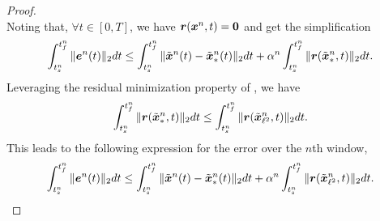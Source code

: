 \begin{proof}
\begin{equation*}
\end{equation*}
Noting that, $\forall t \in [0,T]$, we have $\boldsymbol r({\boldsymbol x}^{n},t) = \boldsymbol 0$ and get the simplification 
\begin{equation*}
\int_{t_s^{n}}^{t_f^{n}} \| \boldsymbol e^{n}(t) \|_2 dt \le \int_{t_s^{n}}^{t_f^{n}} \| \tilde{\boldsymbol x}^{n}(t) - \tilde{\boldsymbol x}_{*}^{n}(t) \|_2 dt + \alpha^{n} \int_{t_s^{n}}^{t_f^{n}} \|  \boldsymbol r(\tilde{\boldsymbol x}_{*}^{n},t)  \|_2 dt.
\end{equation*}
Leveraging the residual minimization property of \methodAcronym, we have 
$$ \int_{t_s^{n}}^{t_f^{n}} \| \boldsymbol r(\tilde{\boldsymbol x}_{*}^{n},t) \|_2dt \le \int_{t_s^{n}}^{t_f^{n}} \| \boldsymbol r(\tilde{\boldsymbol x}_{\ell^2}^{n},t) \|_2dt.$$
This leads to the following expression for the error over the $n$th window,
\begin{equation}\label{eq:boundtmp}
\int_{t_s^{n}}^{t_f^{n}} \| \boldsymbol e^{n}(t) \|_2 dt \le \int_{t_s^{n}}^{t_f^{n}} \| \tilde{\boldsymbol x}^{n}(t) - \tilde{\boldsymbol x}_{*}^{n}(t) \|_2 dt + \alpha^{n} \int_{t_s^{n}}^{t_f^{n}} \|  \boldsymbol r(\tilde{\boldsymbol x}_{\ell^2}^{n},t)  \|_2 dt.
\end{equation}
\begin{comment}
To obtain an expression for $\norm{\stateROMSolArg{n}{t} - \stateROMStarSolArgt{n}{t}}$ start by noting that
$\stateROMStarSolArg{n}$ and $\stateROMSolArg{n}$ are defined by the systems,
\begin{align*} 
&\frac{d}{dt} \genstateROMSolArg{n}   -
\basisspace^T  \velocity(\basisspace \genstateROMSolArg{n} + \stateIntercept,t) =  \adjointROMSolArg{n} , \\
 &\frac{d}{dt} \adjointROMSolArg{n} + \basisspace^T \bigg[\frac{\partial
\velocity}{\partial \stateyDiscrete}(\basisspace \genstateROMSolArg{n} +
\stateIntercept,t)\bigg]^T \basisspace \adjointROMSolArg{n} = \basisspace^T \bigg[
\frac{\partial \velocity}{\partial \stateyDiscrete} (\basisspace \genstateROMSolArg{n} +
\stateIntercept,t) \bigg]^T \bigg( \mathbf{I} -   \basisspace \basisspace^T
\bigg)    \velocity(\basisspace \genstateROMSolArg{n} + \stateIntercept,t) , \\  
& \genstateROMSolArgt{n}{\timeStartArg{n}} =

\end{comment}
\end{proof}
